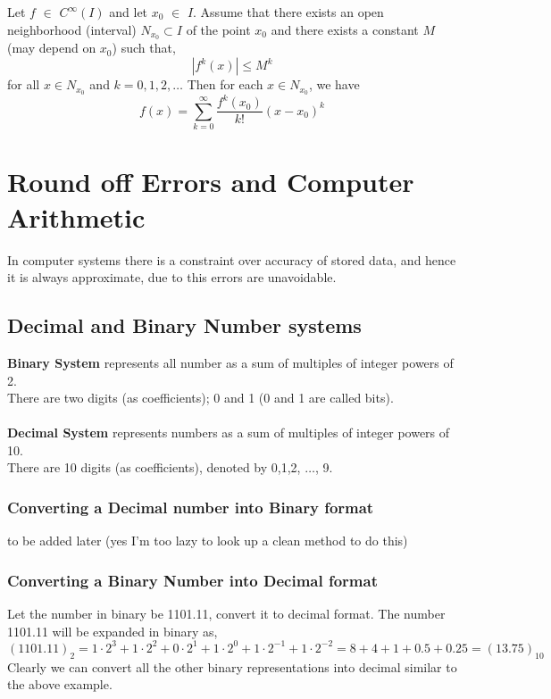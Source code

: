 \documentclass[../Main.tex]{subfiles}
\begin{document}
\thmp{}
{
   Let $f$ $\in$ $C^{\infty}(I)$ and let $x_0$ $\in$ $I$. Assume that there exists an open neighborhood (interval) $N_{x_0} \subset I$ of the point $x_0$ and there exists a constant $M$ (may depend on $x_0$) such that,
   \begin{equation}
      \left | f^{k}(x) \right | \leq M^k
   \end{equation}
   for all $x \in N_{x_0}$ and $k = 0, 1, 2, \dots$ Then for each $x \in N_{x_0}$, we have
   \begin{equation}
      f(x) = \sum_{k=0}^{\infty} \frac{f^k(x_0)}{k!}(x-x_0)^k
   \end{equation}
}
{}

\section{Round off Errors and Computer Arithmetic}
In computer systems there is a constraint over accuracy of stored data, and hence it is always approximate, due to this errors are unavoidable.

\subsection{Decimal and Binary Number systems}
\textbf{Binary System} represents all number as a sum of multiples of integer powers of 2.\\
There are two digits (as coefficients); 0 and 1 (0 and 1 are called bits).\\\\
\textbf{Decimal System} represents numbers as a sum of multiples of integer powers of 10.\\
There are 10 digits (as coefficients), denoted by 0,1,2, $\dots$, 9.


\subsubsection{Converting a Decimal number into Binary format}
to be added later (yes I'm too lazy to look up a clean method to do this)

\subsubsection{Converting a Binary Number into Decimal format}
\exm
{Let the number in binary be 1101.11, convert it to decimal format.}
{   
   The number 1101.11 will be expanded in binary as,
   \begin{equation*}
      (1101.11)_2 = 1 \cdot 2^3 + 1 \cdot 2^2 + 0 \cdot 2^1 + 1 \cdot 2^0 + 1 \cdot 2^{-1} + 1 \cdot 2^{-2} = 8 + 4 + 1 + 0.5 + 0.25 = (13.75)_{10}
   \end{equation*}
}
Clearly we can convert all the other binary representations into decimal similar to the above example.
\end{document}
